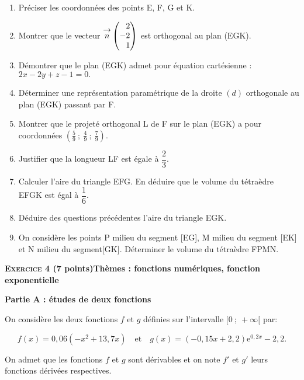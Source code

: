 \documentclass[11pt,a4paper,french]{article}
\newcommand{\vect}[1]{\overrightarrow{\,\mathstrut#1\,}}
\begin{document}
\medskip

\begin{enumerate}
\item Préciser les coordonnées des points E, F{}, G et K.
\item Montrer que le vecteur $\vect{n}\begin{pmatrix}\phantom{-}2\\-2\\\phantom{-}1\end{pmatrix}$ est orthogonal au plan (EGK).
\item Démontrer que le plan (EGK) admet pour équation cartésienne : $2x - 2y + z - 1 = 0.$
\item Déterminer une représentation paramétrique de la droite $(d)$ orthogonale au plan (EGK)
passant par F{}.
\item Montrer que le projeté orthogonal L de F sur le plan (EGK) a pour coordonnées $\left(\frac59~;~\frac49~;~\frac79\right)$.
\item Justifier que la longueur LF est égale à $\dfrac23$.
\item Calculer l'aire du triangle EFG. En déduire que le volume du tétraèdre EFGK est égal à $\dfrac16$.
\item Déduire des questions précédentes l'aire du triangle EGK.
\item On considère les points P milieu du segment [EG], M milieu du segment [EK] et N milieu du segment[GK]. Déterminer le volume du tétraèdre FPMN.
\end{enumerate}

\bigskip

\textbf{\textsc{Exercice 4} \quad (7 points)\hfill Thèmes : fonctions numériques, fonction exponentielle}

\begin{center}

\textbf{Partie A : études de deux fonctions}

\end{center}

On considère les deux fonctions $f$ et $g$ définies sur l'intervalle $[0~;~+\infty[$ par:

\[f(x) = 0,06\left(-x^2 +13,7x\right)\quad  \text{et}\quad  g(x) = (-0,15x + 2,2)\text{e}^{0,2x} - 2,2.\]

On admet que les fonctions $f$ et $g$ sont dérivables et on note $f'$ et $g'$ leurs fonctions dérivées respectives.

\medskip
\end{document}
